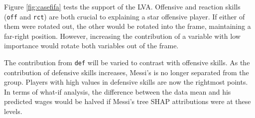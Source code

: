 \documentclass[
]{jss}
\begin{document}
Figure \ref{fig:casefifa} tests the support of the LVA. Offensive and
reaction skills (\texttt{off} and \texttt{rct}) are both crucial to
explaining a star offensive player. If either of them were rotated out,
the other would be rotated into the frame, maintaining a far-right
position. However, increasing the contribution of a variable with low
importance would rotate both variables out of the frame.

The contribution from \texttt{def} will be varied to contrast with
offensive skills. As the contribution of defensive skills increases,
Messi's is no longer separated from the group. Players with high values
in defensive skills are now the rightmost points. In terms of what-if
analysis, the difference between the data mean and his predicted wages
would be halved if Messi's tree SHAP attributions were at these levels.
\end{document}
